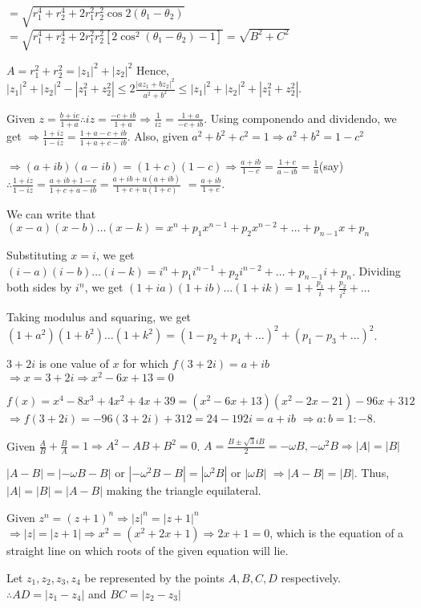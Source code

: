   $= \sqrt{r_1^4 + r_2^4 + 2r_1^2r_2^2\cos2(\theta_1 - \theta_2)}$
  $= \sqrt{r_1^4 + r_2^4 + 2r_1^2r_2^2[2\cos^2(\theta_1 - \theta_2) - 1]} = \sqrt{B^2 + C^2}$

  $A = r_1^2 + r_2^2 = |z_1|^2 + |z_2|^2$
  Hence, $|z_1|^2 + |z_2|^2 - |z_1^2 + z_2^2| \leq 2\frac{|az_1 + bz_2|^2}{a^2 + b^2}\leq |z_1|^2 + |z_2|^2
  + |z_1^2 + z_2^2|$.
\item Given $z = \frac{b + ic}{1 + a} \therefore iz = \frac{-c + ib}{1 + a} \Rightarrow \frac{1}{iz} =
  \frac{1 + a}{-c + ib}$. Using componendo and dividendo, we get
  $\Rightarrow \frac{1 + iz}{1 - iz} = \frac{1 + a - c + ib}{1 + a + c - ib}$.
  Also, given $a^2 + b^2 + c^2 = 1 \Rightarrow a^2 + b^2 = 1 - c^2$

  $\Rightarrow (a + ib)(a - ib) = (1 + c)(1 - c)\Rightarrow \frac{a + ib}{1 - c} = \frac{1 + c}{a - ib} =
  \frac{1}{u}$(say) $\therefore \frac{1 + iz}{1 - iz} = \frac{a + ib + 1 - c}{1 + c + a - ib} = \frac{a + ib
    + u(a + ib)}{1 + c + u(1 + c)}$ $= \frac{a + ib}{1 + c}$.
\item We can write that $(x - a)(x - b)\ldots (x - k) = x^n + p_1x^{n - 1} + p_2x^{n - 2} + \ldots + p_{n -
  1}x + p_n$

  Substituting $x = i$, we get
  $(i - a)(i - b)\ldots (i - k) = i^n + p_1i^{n - 1} + p_2i^{n - 2} + \ldots + p_{n - 1}i +  p_n$.
  Dividing both sides by $i^n$, we get
  $(1 + ia)(1 + ib)\ldots(1 + ik) = 1 + \frac{p_1}{i} + \frac{p_2}{i^2} + \ldots$

  Taking modulus and squaring, we get
  $(1 + a^2)(1 + b^2)\ldots (1 + k^2) = (1 - p_2 + p_4 + \ldots)^2 + (p_1 - p_3 + \ldots)^2$.
\item $3 + 2i$ is one value of $x$ for which $f(3 + 2i) = a + ib$
  $\Rightarrow x = 3 + 2i \Rightarrow x^2 - 6x + 13 = 0$

  $f(x) = x^4 - 8x^3 + 4x^2 + 4x + 39 = (x^2 - 6x + 13)(x^2 - 2x -21) -96x + 312$
  $\Rightarrow f(3 + 2i) = -96(3 + 2i) + 312 = 24 - 192i = a + ib$
  $\Rightarrow a:b = 1:-8$.
\item Given $\frac{A}{B} + \frac{B}{A} = 1 \Rightarrow A^2 - AB + B^2 = 0$.
  $A = \frac{B \pm \sqrt{3}iB}{2} = -\omega B, -\omega^2B\Rightarrow |A| = |B|$

  $|A - B| = |-\omega B - B|$ or $|-\omega^2B - B| = |\omega^2 B|$ or $|\omega B|$
  $\Rightarrow |A - B| = |B|$.
  Thus, $|A| = |B| = |A - B|$ making the triangle equilateral.
\item Given $z^n = (z + 1)^n \Rightarrow |z|^n = |z + 1|^n$
  $\Rightarrow |z| = |z + 1|\Rightarrow x^2 = (x^2 + 2x + 1) \Rightarrow 2x + 1 = 0$,
  which is the equation of a straight line on which roots of the given equation will lie.
\item Let $z_1, z_2, z_3, z_4$ be represented by the points $A, B, C, D$ respectively.
  $\therefore AD = |z_1 - z_4|$ and $BC = |z_2 - z_3|$

